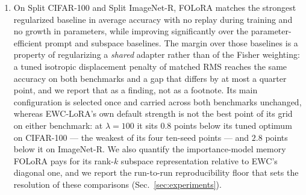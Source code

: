 \begin{enumerate}
\item On Split CIFAR-100 and Split ImageNet-R, FOLoRA matches the strongest regularized
baseline in average accuracy with no replay during training and no growth in parameters,
while improving significantly over the parameter-efficient prompt and subspace baselines.
The margin over those baselines is a property of regularizing a \emph{shared} adapter rather
than of the Fisher weighting: a tuned isotropic displacement penalty of matched RMS reaches
the same accuracy on both benchmarks and a gap that differs by at most a quarter point, and
we report that as a finding, not as a footnote. Its
main configuration is selected once and carried across both benchmarks unchanged, whereas
EWC-LoRA's own default strength is not the best point of its grid on either
benchmark: at $\lambda{=}100$ it sits $0.8$ points below its tuned optimum on CIFAR-100 ---
the weakest of its four ten-seed points --- and $2.8$ points below it on ImageNet-R. We also
quantify the importance-model
memory FOLoRA pays for its rank-$k$ subspace representation relative to EWC's diagonal
one, and we report the run-to-run reproducibility floor that
sets the resolution of these comparisons (Sec.~\ref{sec:experiments}).
\end{enumerate}
